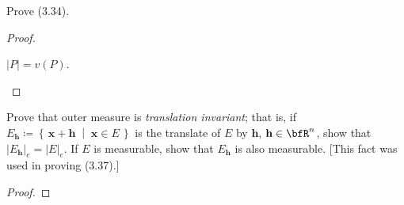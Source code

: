 \begin{problem}
Prove (3.34).
\end{problem}
\begin{proof}
\begin{lemma*}
$\left|P\right|=v(P)$.
\end{lemma*}
\end{proof}
\newpage

\begin{problem}
Prove that outer measure is \emph{translation invariant}; that is, if
$E_{\textbf{h}}\coloneqq\left\{\,\mathbf{x}+\mathbf{h}\;\middle|\;\mathbf{x}\in
  E\,\right\}$ is the translate of $E$ by $\mathbf{h}$,
$\mathbf{h}\in\bfR^n$, show that
$\left|E_{\mathbf{h}}\right|_e=\left|E\right|_e$. If $E$ is measurable,
show that $E_{\mathbf{h}}$ is also measurable. [This fact was used in
proving (3.37).]
\end{problem}
\begin{proof}
\end{proof}

